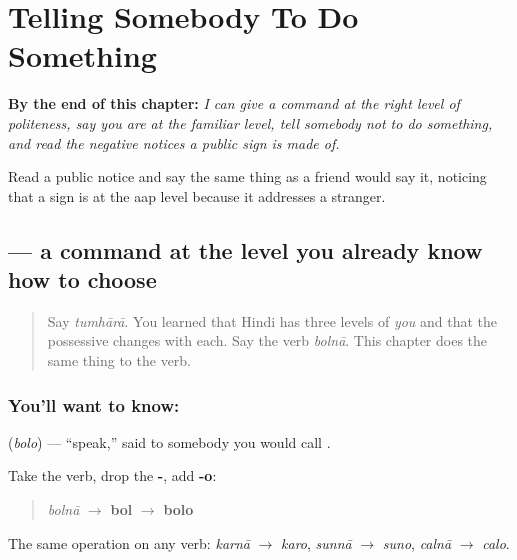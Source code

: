 
\chapter{Telling Somebody To Do Something}
\label{ch:hi-adesh}

\begin{chapteropening}
\textbf{By the end of this chapter:} \emph{I can give a command at the right level of politeness, say you are at the familiar level, tell somebody not to do something, and read the negative notices a public sign is made of.}

Read a public notice and say the same thing as a friend would say it, noticing that a sign is at the aap level because it addresses a stranger.
\end{chapteropening}

\section[\texorpdfstring{\hi{बोलो} (bolo)}{बोलो (bolo)}]{ — a command at the level you already know how to choose}

\label{lesson:HI-C85-bolo}



\begin{quote}
Say \emph{tumhārā}. You learned that Hindi has three levels of \emph{you} and that the possessive changes with each. Say the verb \emph{bolnā}. This chapter does the same thing to the verb.
\end{quote}

\subsection*{You'll want to know: }
\textbf{} (\emph{bolo}) — \textquotedblleft{}speak,\textquotedblright{} said to somebody you would call \textbf{}.

Take the verb, drop the \textbf{-}, add \textbf{-o}:

\begin{quote}
\emph{bolnā} $\to$ \textbf{bol} $\to$ \textbf{bolo}
\end{quote}

The same operation on any verb: \emph{karnā} $\to$ \emph{karo}, \emph{sunnā} $\to$ \emph{suno}, \emph{calnā} $\to$ \emph{calo}.

